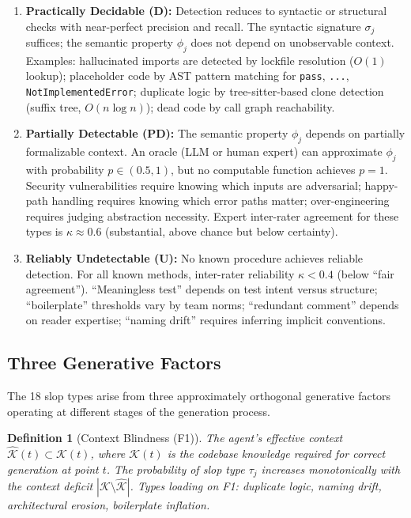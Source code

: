 \documentclass[11pt, a4paper, logo, copyright]{googledeepmind}
\newtheorem{definition}{Definition}[section]
\begin{document}
\begin{enumerate}
    \item \textbf{Practically Decidable (D):} Detection reduces to syntactic or structural checks with near-perfect precision and recall. The syntactic signature $\sigma_j$ suffices; the semantic property $\phi_j$ does not depend on unobservable context. Examples: hallucinated imports are detected by lockfile resolution ($O(1)$ lookup); placeholder code by AST pattern matching for \texttt{pass}, \texttt{...}, \texttt{NotImplementedError}; duplicate logic by tree-sitter-based clone detection (suffix tree, $O(n \log n)$); dead code by call graph reachability.

    \item \textbf{Partially Detectable (PD):} The semantic property $\phi_j$ depends on partially formalizable context. An oracle (LLM or human expert) can approximate $\phi_j$ with probability $p \in (0.5, 1)$, but no computable function achieves $p = 1$. Security vulnerabilities require knowing which inputs are adversarial; happy-path handling requires knowing which error paths matter; over-engineering requires judging abstraction necessity. Expert inter-rater agreement for these types is $\kappa \approx 0.6$ (substantial, above chance but below certainty).

    \item \textbf{Reliably Undetectable (U):} No known procedure achieves reliable detection. For all known methods, inter-rater reliability $\kappa < 0.4$ (below ``fair agreement''). ``Meaningless test'' depends on test intent versus structure; ``boilerplate'' thresholds vary by team norms; ``redundant comment'' depends on reader expertise; ``naming drift'' requires inferring implicit conventions.
\end{enumerate}

\subsection{Three Generative Factors}

The 18 slop types arise from three approximately orthogonal generative factors operating at different stages of the generation process.

\begin{definition}[Context Blindness (F1)]
\label{def:f1}
The agent's effective context $\hat{\mathcal{K}}(t) \subset \mathcal{K}(t)$, where $\mathcal{K}(t)$ is the codebase knowledge required for correct generation at point $t$. The probability of slop type $\tau_j$ increases monotonically with the context deficit $|\mathcal{K} \setminus \hat{\mathcal{K}}|$. Types loading on F1: duplicate logic, naming drift, architectural erosion, boilerplate inflation.
\end{definition}
\end{document}
